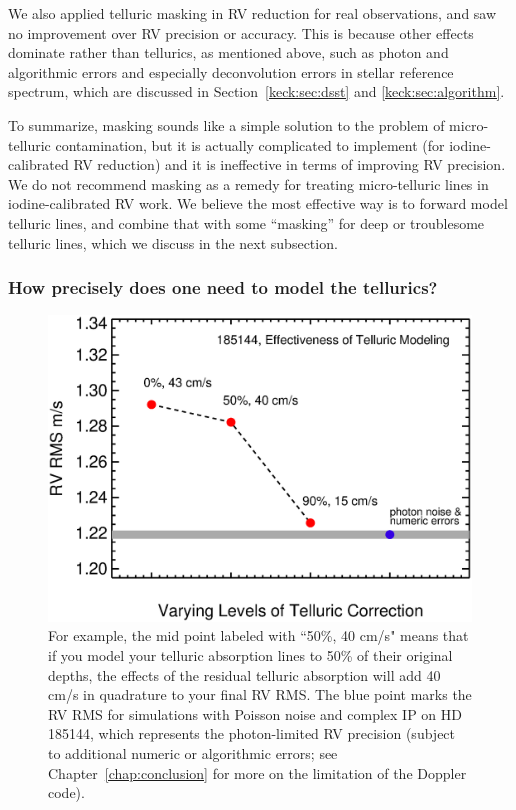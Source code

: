 We also applied telluric masking in RV reduction for real
observations, and saw no improvement over RV precision or
accuracy. This is because other effects dominate rather than
tellurics, as mentioned above, such as photon and algorithmic errors
and especially deconvolution errors in stellar reference spectrum,
which are discussed in Section~\ref{keck:sec:dsst} and
\ref{keck:sec:algorithm}.

To summarize, masking sounds like a simple solution to the problem of
micro-telluric contamination, but it is actually complicated to
implement (for iodine-calibrated RV reduction) and it is ineffective
in terms of improving RV precision. We do not recommend masking as a
remedy for treating micro-telluric lines in iodine-calibrated RV
work. We believe the most effective way is to forward model telluric
lines, and combine that with some ``masking'' for deep or troublesome
telluric lines, which we discuss in the next subsection.

\subsubsection{How precisely does one need to model the tellurics?}\label{keck:telluric:neid}


\begin{figure}
\includegraphics[scale=0.5]{telluric/neid.eps} 
\caption{ For example, the mid point labeled with ``50\%, 40 cm/s"
  means that if you model your telluric absorption lines to 50\% of
  their original depths, the effects of the residual telluric
  absorption will add 40 cm/s in quadrature to your final RV RMS. The
  blue point marks the RV RMS for simulations with Poisson noise and
  complex IP on HD 185144, which represents the photon-limited RV
  precision (subject to additional numeric or algorithmic errors; see
  Chapter~\ref{chap:conclusion} for more on the limitation of the
  Doppler code).
\label{telluric:fig:neid}}
\end{figure}


